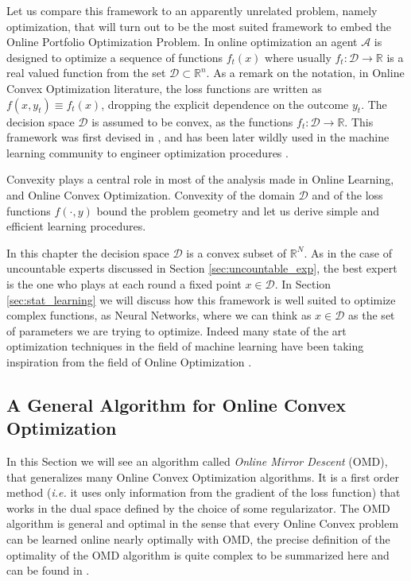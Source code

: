 Let us compare this framework to an apparently unrelated problem, namely optimization, that will turn out to be the most suited framework to embed the Online Portfolio Optimization Problem. In online optimization an agent $\mathcal A$ is designed to optimize a sequence of functions $f_t(x)$ where usually $f_t:\mathcal D\to \mathbb R$ is a real valued function from the set $\mathcal D\subset\mathbb R^n$. As a remark on the notation, in Online Convex Optimization literature, the loss functions are written as $f(x,y_t)\equiv f_t(x)$, dropping the explicit dependence on the outcome $y_t$.
The decision space $\mathcal D$ is assumed to be convex, as the functions $f_t:\mathcal D\to \mathbb R$. This framework was first devised in \cite{zinkevich2003online}, and has been later wildly used in the machine learning community to engineer optimization procedures \cite{shalev2012online}. 

Convexity plays a central role in most of the analysis made in Online Learning, and Online Convex Optimization. Convexity of the domain $\mathcal D$ and of the loss functions $f(\cdot,y)$ bound the problem geometry and let us derive simple and efficient learning procedures.

In this chapter the decision space $\mathcal D$ is a convex subset of $\mathbb R^N$. As in the case of uncountable experts discussed in Section \ref{sec:uncountable_exp}, the best expert is the one who plays at each round a fixed point $x\in\mathcal D$. In Section \ref{sec:stat_learning} we will discuss how this framework is well suited to optimize complex functions, as Neural Networks, where we can think as $x\in\mathcal D$ as the set of parameters we are trying to optimize. Indeed many state of the art optimization techniques in the field of machine learning have been taking inspiration from the field of Online Optimization \cite{duchi2011adaptive}.

\subsection{A General Algorithm for Online Convex Optimization}\label{sec:OMD}

In this Section we will see an algorithm called \emph{Online Mirror Descent} (OMD), that generalizes many Online Convex Optimization algorithms. It is a first order method (\emph{i.e.} it uses only information from the gradient of the loss function) that works in the dual space  defined by the choice of some regularizator. The OMD algorithm is general and optimal in the sense that every Online Convex problem can be learned online nearly optimally with OMD, the precise definition of the optimality of the OMD algorithm is quite complex to be summarized here and can be found in \cite{srebro2011universality}.

